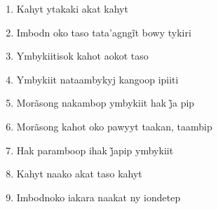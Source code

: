 \begin{enumerate}
 \item Kahyt ytakaki akat kahyt
 \item Imbodn oko taso tata’agngĩt bowy tykiri
 \item Ymbykiitisok kahot aokot taso
 \item Ymbykiit nataambykyj kangoop ipiiti
 \item Morãsong nakambop ymbykiit hak j̃a pip
 \item Morãsong kahot oko pawyyt taakan, taambip
 \item Hak paramboop ihak j̃apip ymbykiit
 \item Kahyt naako akat taso kahyt
 \item Imbodnoko iakara naakat ny iondetep
\end{enumerate}
